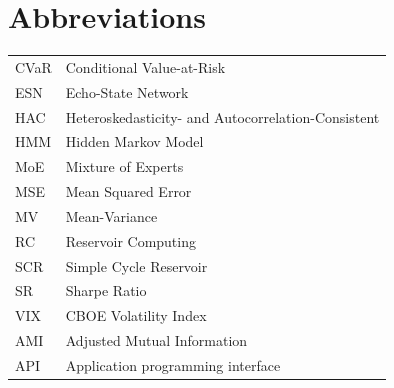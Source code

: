 
\chapter*{Abbreviations}

\begin{flushleft}

\begin{tabular}{ll}
CVaR & Conditional Value-at-Risk \\
ESN  & Echo-State Network \\
HAC  & Heteroskedasticity- and Autocorrelation-Consistent \\
HMM  & Hidden Markov Model \\
MoE  & Mixture of Experts \\
MSE  & Mean Squared Error \\
MV   & Mean-Variance \\
RC   & Reservoir Computing \\
SCR  & Simple Cycle Reservoir \\
SR   & Sharpe Ratio \\
VIX  & CBOE Volatility Index \\
AMI & Adjusted Mutual Information \\
API & Application programming interface \\
\end{tabular}

\end{flushleft}
